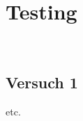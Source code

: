 \documentclass[main.tex]{subfiles} %
\begin{document}

\section{Testing}~\label{sec:Testing}

\subsection{Versuch 1}
etc.
\end{document}
